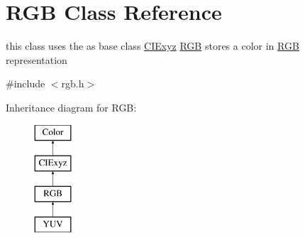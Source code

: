 \hypertarget{class_r_g_b}{}\section{R\+GB Class Reference}
\label{class_r_g_b}


this class uses the as base class \hyperlink{class_c_i_exyz}{C\+I\+Exyz} \hyperlink{class_r_g_b}{R\+GB} stores a color in \hyperlink{class_r_g_b}{R\+GB} representation  




{\ttfamily \#include $<$rgb.\+h$>$}

Inheritance diagram for R\+GB\+:\begin{figure}[H]
\begin{center}
\leavevmode
\includegraphics[height=4.000000cm]{class_r_g_b}
\end{center}
\end{figure}
